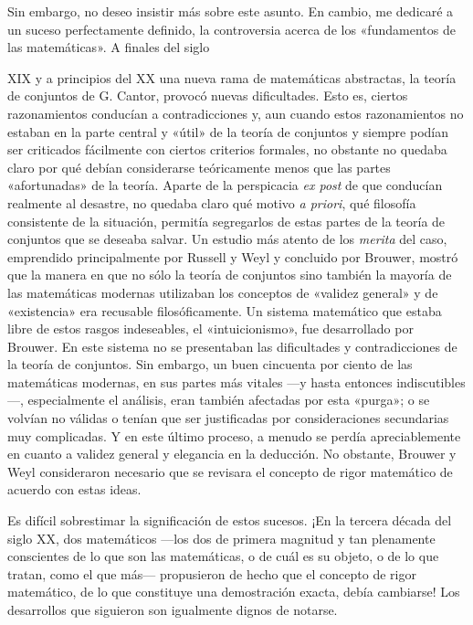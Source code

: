 \documentclass[a4paper, 12pt]{article}
\begin{document}
Sin embargo, no deseo insistir más sobre este asunto. En cambio, me dedicaré a un suceso perfectamente definido, la controversia acerca de los «fundamentos de las matemáticas». A finales del siglo {XIX y a principios del XX una nueva rama de matemáticas abstractas, la teoría de conjuntos de G. Cantor, provocó nuevas dificultades. Esto es, ciertos razonamientos conducían a contradicciones y, aun cuando estos razonamientos no estaban en la parte central y «útil» de la teoría de conjuntos y siempre podían ser criticados fácilmente con ciertos criterios formales, no obstante no quedaba claro por qué debían considerarse teóricamente menos que las partes «afortunadas» de la teoría. Aparte de la perspicacia \textit{ex post} de que conducían realmente al desastre, no quedaba claro qué motivo \textit{a priori}, qué filosofía consistente de la situación, permitía segregarlos de estas partes de la teoría de conjuntos que se deseaba salvar. Un estudio más atento de los \textit{merita} del caso, emprendido principalmente por Russell y Weyl y concluido por Brouwer, mostró que
la manera en que no sólo la teoría de conjuntos sino también la mayoría de las matemáticas modernas utilizaban los conceptos de «validez general» y de «existencia» era recusable filosóficamente. Un sistema matemático que estaba libre de  estos rasgos indeseables, el «intuicionismo», fue desarrollado por Brouwer. En este sistema
 no se presentaban las dificultades y contradicciones de la teoría de  conjuntos. Sin embargo, un buen cincuenta por ciento de las matemáticas modernas, en sus partes más vitales ---y hasta entonces indiscutibles---, especialmente el análisis, eran también afectadas por esta «purga»; o se volvían no válidas o tenían que  ser justificadas por consideraciones secundarias muy complicadas. Y en este último proceso, a menudo se perdía apreciablemente en cuanto a validez general  y elegancia en la deducción. No obstante, Brouwer y Weyl consideraron necesario que  se
revisara el concepto de rigor matemático de acuerdo con estas ideas.


Es difícil sobrestimar la significación de estos sucesos. ¡En la tercera década del siglo XX, dos matemáticos ---los dos de primera magnitud y tan plenamente conscientes de lo que son las matemáticas, o de cuál es su objeto, o de lo que tratan, como el que más--- propusieron de hecho que el concepto de rigor matemático, de lo que constituye una demostración exacta, debía cambiarse! Los desarrollos que siguieron son igualmente dignos de notarse.


\begin{enumerate}


\end{enumerate}}
\end{document}
